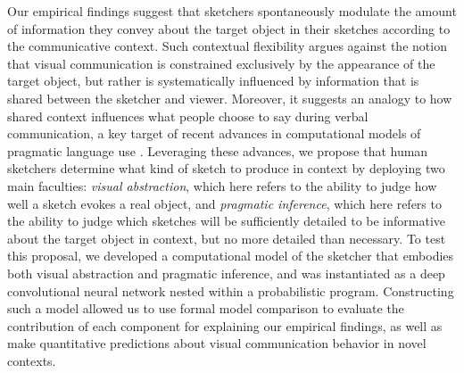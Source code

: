 \documentclass[9pt,twocolumn,twoside]{pnas-new}
\begin{document}
Our empirical findings suggest that sketchers spontaneously modulate the amount of information they convey about the target object in their sketches according to the communicative context. 
Such contextual flexibility argues against the notion that visual communication is constrained exclusively by the appearance of the target object, but rather is systematically influenced by information that is shared between the sketcher and viewer. 
Moreover, it suggests an analogy to how shared context influences what people choose to say during verbal communication, a key target of recent advances in computational models of pragmatic language use \cite{frank2012predicting,goodman2013knowledge,franke2016probabilistic,bergen2016pragmatic}.
Leveraging these advances, we propose that human sketchers determine what kind of sketch to produce in context by deploying two main faculties: \textit{visual abstraction}, which here refers to the ability to judge how well a sketch evokes a real object, and \textit{pragmatic inference}, which here refers to the ability to judge which sketches will be sufficiently detailed to be informative about the target object in context, but no more detailed than necessary. 
To test this proposal, we developed a computational model of the sketcher that embodies both visual abstraction and pragmatic inference, and was instantiated as a deep convolutional neural network nested within a probabilistic program. 
Constructing such a model allowed us to use formal model comparison to evaluate the contribution of each component for explaining our empirical findings, as well as make quantitative predictions about visual communication behavior in novel contexts.
\end{document}
